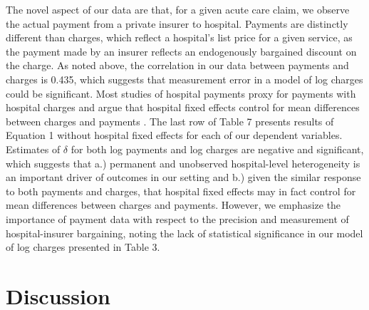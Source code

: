 \documentclass[12pt]{article}
\begin{document}
The novel aspect of our data are that, for a given acute care claim, we observe the actual payment from a private insurer to hospital.  Payments are distinctly different than charges, which reflect a hospital's list price for a given service, as the payment made by an insurer reflects an endogenously bargained discount on the charge.  As noted above, the correlation in our data between payments and charges is 0.435, which suggests that measurement error in a model of log charges could be significant.  Most studies of hospital payments proxy for payments with hospital charges and argue that hospital fixed effects control for mean differences between charges and payments \citep{cutler2000}.  The last row of Table 7 presents results of Equation 1 without hospital fixed effects for each of our dependent variables.  Estimates of $\delta$ for both log payments and log charges are negative and significant, which suggests that a.) permanent and unobserved hospital-level heterogeneity is an important driver of outcomes in our setting and b.) given the similar response to both payments and charges, that hospital fixed effects may in fact control for mean differences between charges and payments.  However, we emphasize the importance of payment data with respect to the precision and measurement of hospital-insurer bargaining, noting the lack of statistical significance in our model of log charges presented in Table 3.

\section{Discussion}
\label{sec:Discussion}
\end{document}

